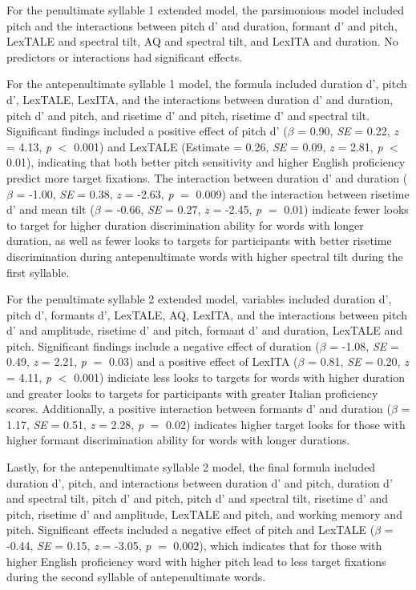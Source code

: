 For the penultimate syllable 1 extended model, the parsimonious model included pitch and the interactions between pitch d' and duration, formant d' and pitch, LexTALE and spectral tilt, AQ and spectral tilt, and LexITA and duration. No predictors or interactions had significant effects.

For the antepenultimate syllable 1 model, the formula included duration d', pitch d', LexTALE, LexITA, and the interactions between duration d' and duration, pitch d' and pitch, and risetime d' and pitch, risetime d' and spectral tilt. Significant findings included a positive effect of pitch d' ($\beta$ = 0.90, \textit{SE} = 0.22, \textit{z} = 4.13, \textit{p} $<$ 0.001) and LexTALE (Estimate = 0.26, \textit{SE} = 0.09, \textit{z} = 2.81, \textit{p} $<$ 0.01), indicating that both better pitch sensitivity and higher English proficiency predict more target fixations. The interaction between duration d' and duration ($\beta$ = -1.00, \textit{SE} = 0.38, \textit{z} = -2.63, \textit{p} $=$ 0.009) and the interaction between risetime d' and mean tilt ($\beta$ = -0.66, \textit{SE} = 0.27, \textit{z} = -2.45, \textit{p} $=$ 0.01) indicate fewer looks to target for higher duration discrimination ability for words with longer duration, as well as fewer looks to targets for participants with better risetime discrimination during antepenultimate words with higher spectral tilt during the first syllable.

For the penultimate syllable 2 extended model, variables included duration d', pitch d', formants d', LexTALE, AQ, LexITA, and the interactions between pitch d' and amplitude, risetime d' and pitch, formant d' and duration, LexTALE and pitch. Significant findings include a negative effect of duration ($\beta$ = -1.08, \textit{SE} = 0.49, \textit{z} = 2.21, \textit{p} $=$ 0.03) and a positive effect of LexITA ($\beta$ = 0.81, \textit{SE} = 0.20, \textit{z} = 4.11, \textit{p} $<$ 0.001) indiciate less looks to targets for words with higher duration and greater looks to targets for participants with greater Italian proficiency scores. Additionally, a positive interaction between formants d' and duration ($\beta$ = 1.17, \textit{SE} = 0.51, \textit{z} = 2.28, \textit{p} $=$ 0.02) indicates higher target looks for those with higher formant discrimination ability for words with longer durations. 

Lastly, for the antepenultimate syllable 2 model, the final formula included duration d', pitch, and interactions between duration d' and pitch, duration d' and spectral tilt, pitch d' and pitch, pitch d' and spectral tilt, risetime d' and pitch, risetime d' and amplitude, LexTALE and pitch, and working memory and pitch. Significant effects included a negative effect of pitch and LexTALE ($\beta$ = -0.44, \textit{SE} = 0.15, \textit{z} = -3.05, \textit{p} $=$ 0.002), which indicates that for those with higher English proficiency word with higher pitch lead to less target fixations during the second syllable of antepenultimate words.

